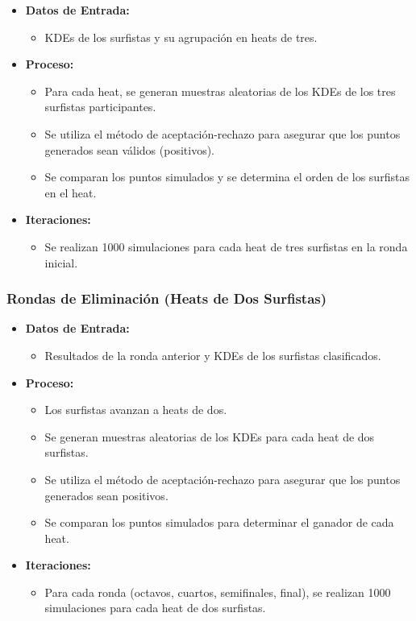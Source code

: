 \documentclass[12pt]{article}
\begin{document}
\begin{itemize}
    \item \textbf{Datos de Entrada:}
        \begin{itemize}
            \item KDEs de los surfistas y su agrupación en heats de tres.
        \end{itemize}
    \item \textbf{Proceso:}
        \begin{itemize}
            \item Para cada heat, se generan muestras aleatorias de los KDEs de los tres surfistas participantes.
            \item Se utiliza el método de aceptación-rechazo para asegurar que los puntos generados sean válidos (positivos).
            \item Se comparan los puntos simulados y se determina el orden de los surfistas en el heat.
        \end{itemize}
    \item \textbf{Iteraciones:}
        \begin{itemize}
            \item Se realizan 1000 simulaciones para cada heat de tres surfistas en la ronda inicial.
        \end{itemize}
\end{itemize}

\subsubsection*{Rondas de Eliminación (Heats de Dos Surfistas)}

\begin{itemize}
    \item \textbf{Datos de Entrada:}
        \begin{itemize}
            \item Resultados de la ronda anterior y KDEs de los surfistas clasificados.
        \end{itemize}
    \item \textbf{Proceso:}
        \begin{itemize}
            \item Los surfistas avanzan a heats de dos.
            \item Se generan muestras aleatorias de los KDEs para cada heat de dos surfistas.
            \item Se utiliza el método de aceptación-rechazo para asegurar que los puntos generados sean positivos.
            \item Se comparan los puntos simulados para determinar el ganador de cada heat.
        \end{itemize}
    \item \textbf{Iteraciones:}
        \begin{itemize}
            \item Para cada ronda (octavos, cuartos, semifinales, final), se realizan 1000 simulaciones para cada heat de dos surfistas.
        \end{itemize}
\end{itemize}
\end{document}
